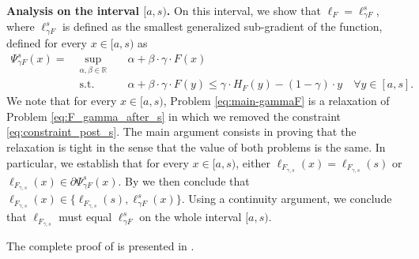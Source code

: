 \noindent \textbf{Analysis on the interval $[a,s)$.}
On this interval, we show that $\ell_F=\ell_{\gamma F}^s$, where $\ell_{\gamma F}^s$ is defined as the smallest generalized sub-gradient of the function, defined for every $x \in [a,s)$ as
\begin{subequations}\label{eq:main-gammaF}
\begin{alignat}{2}
\Psi^s_{\gamma F}(x) = \; &\!\sup_{\alpha,\beta \in \mathbb{R}} &\;& \alpha +  \beta \cdot \gamma \cdot F(x) \\
&\text{s.t.} &      &  \alpha + \beta \cdot \gamma \cdot F(y) \leq \gamma \cdot H_{F}(y) - (1-\gamma) \cdot y \quad \forall y \in [a,s]. %
\end{alignat}
\end{subequations}
We note that for every $x \in [a,s)$, Problem \eqref{eq:main-gammaF} is a relaxation of Problem \eqref{eq:F_gamma_after_s} in which we removed the constraint \eqref{eq:constraint_post_s}. The main argument consists in proving that the relaxation is tight in the sense that the value of both problems is the same. 
In particular, we establish that for every $x \in [a,s)$, either $\ell_{F_{\gamma,s}}(x) = \ell_{F_{\gamma,s}}(s)$ or $\ell_{F_{\gamma,s}}(x) \in \partial \Psi_{\gamma F}^s(x)$. By  we then conclude that $\ell_{F_{\gamma,s}}(x) \in \{\ell_{F_{\gamma,s}}(s), \ell_{\gamma F}^s(x)\}.$
Using a continuity argument, we conclude that $\ell_{F_{\gamma,s}}$ must equal $\ell_{\gamma F}^s$ on the whole interval $[a,s)$.





The complete proof of  is presented in .

    